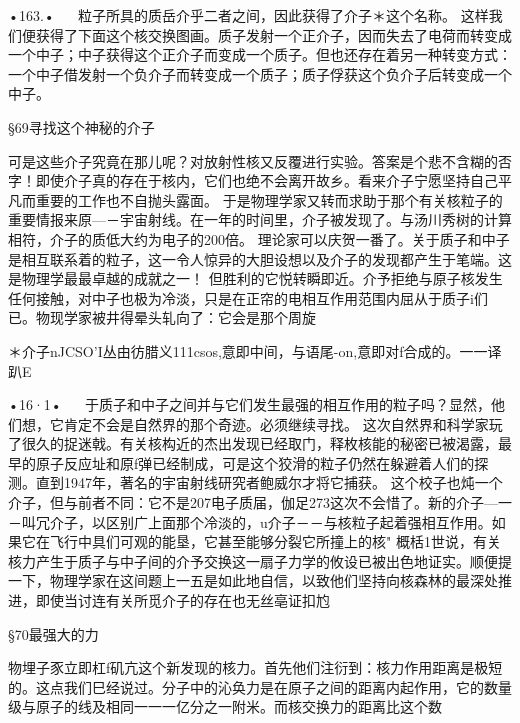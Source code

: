 •163.•
  
粒子所具的质岳介乎二者之间，因此获得了介子＊这个名称。
这样我们便获得了下面这个核交换图画。质子发射一个正介子，因而失去了电荷而转变成一个中子；中子获得这个正介子而变成一个质子。但也还存在着另一种转变方式：一个中子借发射一个负介子而转变成一个质子；质子俘获这个负介子后转变成一个中子。

§69寻找这个神秘的介子

可是这些介子究竟在那儿呢？对放射性核又反覆进行实验。答案是个悲不含糊的否字！即使介子真的存在于核内，它们也绝不会离开故乡。看来介子宁愿坚持自己平凡而重要的工作也不自抛头露面。
于是物理学家又转而求助于那个有关核粒子的重要情报来原—－宇宙射线。在一年的时间里，介子被发现了。与汤川秀树的计算相符，介子的质低大约为电子的200倍。
理论家可以庆贺一番了。关于质子和中子是相互联系着的粒子，这一令人惊异的大胆设想以及介子的发现都产生于笔端。这是物理学最最卓越的成就之一！
但胜利的它悦转瞬即近。介予拒绝与原子核发生任何接触，对中子也极为冷淡，只是在正帘的电相互作用范围内屈从于质子i们已。物现学家被井得晕头轧向了：它会是那个周旋

＊介子nJCSO'I丛由彷腊义111csos,意即中间，与语尾-on,意即对f合成的。一一译趴E

•16·1•
  
于质子和中子之间并与它们发生最强的相互作用的粒子吗？显然，他们想，它肯定不会是自然界的那个奇迹。必须继续寻找。
这次自然界和科学家玩了很久的捉迷戟。有关核构近的杰出发现已经取门，释枚核能的秘密已被渴露，最早的原子反应址和原f弹已经制成，可是这个狡滑的粒子仍然在躲避着人们的探测。直到1947年，著名的宇宙射线研究者鲍威尔才将它捕获。
这个校子也炖一个介子，但与前者不同：它不是207电子质届，伽足273这次不会惜了。新的介子—一－叫冗介子，以区别广上面那个冷淡的，u介子－－与核粒子起着强相互作用。如果它在飞行中具们可观的能垦，它甚至能够分裂它所撞上的核"
概栝1世说，有关核力产生于质子与中子间的介予交换这一扇子力学的攸设已被出色地证实。顺便提一下，物理学家在这间题上一五是如此地自信，以致他们坚持向核森林的最深处推进，即使当讨连有关所觅介子的存在也无丝亳证扣尥

§70最强大的力

物埋子豕立即杠f矶亢这个新发现的核力。首先他们注衍到：核力作用距离是极短的。这点我们巳经说过。分子中的沁奂力是在原子之间的距离内起作用，它的数量级与原子的线及相同一一一亿分之一附米。而核交换力的距离比这个数

